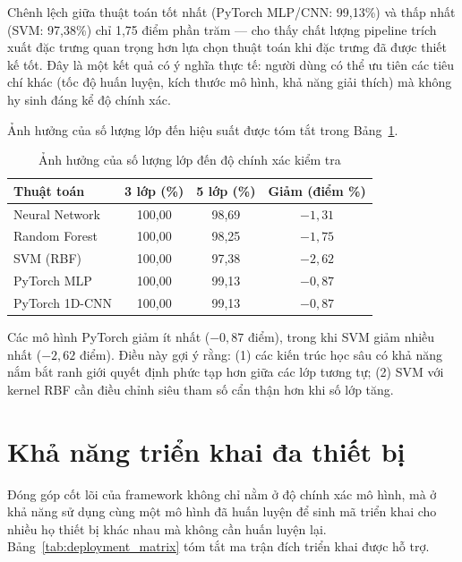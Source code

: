 Chênh lệch giữa thuật toán tốt nhất (PyTorch MLP/CNN: 99,13\%) và thấp nhất (SVM: 97,38\%) chỉ 1,75 điểm phần trăm --- cho thấy chất lượng pipeline trích xuất đặc trưng quan trọng hơn lựa chọn thuật toán khi đặc trưng đã được thiết kế tốt. Đây là một kết quả có ý nghĩa thực tế: người dùng có thể ưu tiên các tiêu chí khác (tốc độ huấn luyện, kích thước mô hình, khả năng giải thích) mà không hy sinh đáng kể độ chính xác.

Ảnh hưởng của số lượng lớp đến hiệu suất được tóm tắt trong Bảng~\ref{tab:class_scaling}.

\begin{table}[H]
    \centering
    \caption{Ảnh hưởng của số lượng lớp đến độ chính xác kiểm tra}
    \label{tab:class_scaling}
    \begin{tabular}{@{}lccc@{}}
        \toprule
        Thuật toán & 3 lớp (\%) & 5 lớp (\%) & Giảm (điểm \%) \\
        \midrule
        Neural Network & 100,00 & 98,69 & $-1{,}31$ \\
        Random Forest & 100,00 & 98,25 & $-1{,}75$ \\
        SVM (RBF) & 100,00 & 97,38 & $-2{,}62$ \\
        PyTorch MLP & 100,00 & 99,13 & $-0{,}87$ \\
        PyTorch 1D-CNN & 100,00 & 99,13 & $-0{,}87$ \\
        \bottomrule
    \end{tabular}
\end{table}

Các mô hình PyTorch giảm ít nhất ($-0{,}87$ điểm), trong khi SVM giảm nhiều nhất ($-2{,}62$ điểm). Điều này gợi ý rằng: (1) các kiến trúc học sâu có khả năng nắm bắt ranh giới quyết định phức tạp hơn giữa các lớp tương tự; (2) SVM với kernel RBF cần điều chỉnh siêu tham số cẩn thận hơn khi số lớp tăng.

\section{Khả năng triển khai đa thiết bị}
\label{sec:multi_device}

Đóng góp cốt lõi của framework không chỉ nằm ở độ chính xác mô hình, mà ở khả năng sử dụng cùng một mô hình đã huấn luyện để sinh mã triển khai cho nhiều họ thiết bị khác nhau mà không cần huấn luyện lại. Bảng~\ref{tab:deployment_matrix} tóm tắt ma trận đích triển khai được hỗ trợ.

